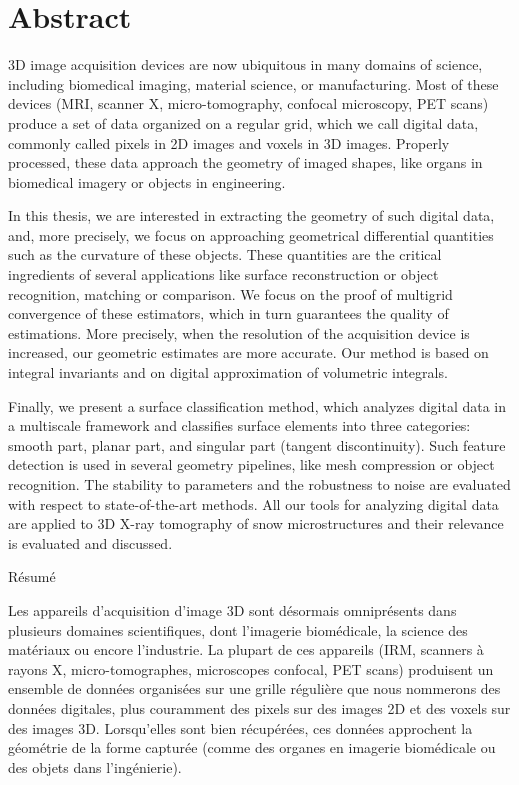 %
\chapter*{Abstract}
\label{sec:abstract}
\vspace*{-10mm}

3D image acquisition devices are now ubiquitous in many domains of science,
including biomedical imaging, material science, or manufacturing. Most of these
devices (MRI, scanner X, micro-tomography, confocal microscopy, PET scans)
produce a set of data organized on a regular grid, which we call digital data,
commonly called pixels in 2D images and voxels in 3D images. Properly processed,
these data approach the geometry of imaged shapes, like organs in biomedical
imagery or objects in engineering.

In this thesis, we are interested in extracting the geometry of such digital
data, and, more precisely, we focus on approaching geometrical differential
quantities such as the curvature of these objects. These quantities are the
critical ingredients of several applications like surface reconstruction or
object recognition, matching or comparison. We focus on the proof of multigrid
convergence of these estimators, which in turn guarantees the quality of
estimations. More precisely, when the resolution of the acquisition device is
increased, our geometric estimates are more accurate. Our method is based on
integral invariants and on digital approximation of volumetric integrals.

Finally, we present a surface classification method, which analyzes digital data
in a multiscale framework and classifies surface elements into three categories:
smooth part, planar part, and singular part (tangent discontinuity). Such
feature detection is used in several geometry pipelines, like mesh compression
or object recognition. The stability to parameters and the robustness to noise
are evaluated with respect to state-of-the-art methods. All our tools for
analyzing digital data are applied to 3D X-ray tomography of snow
microstructures and their relevance is evaluated and discussed.

\vspace*{20mm}

{Résumé}
\label{sec:abstract-french}
\vspace*{5mm}

Les appareils d'acquisition d'image 3D sont désormais omniprésents dans
plusieurs domaines scientifiques, dont l'imagerie biomédicale, la science des
matériaux ou encore l'industrie. La plupart de ces appareils (IRM, scanners à
rayons X, micro-tomographes, microscopes confocal, PET scans) produisent un
ensemble de données organisées sur une grille régulière que nous nommerons des
données digitales, plus couramment des pixels sur des images 2D et des voxels sur
des images 3D. Lorsqu'elles sont bien récupérées, ces données approchent la
géométrie de la forme capturée (comme des organes en imagerie biomédicale ou des
objets dans l'ingénierie).

